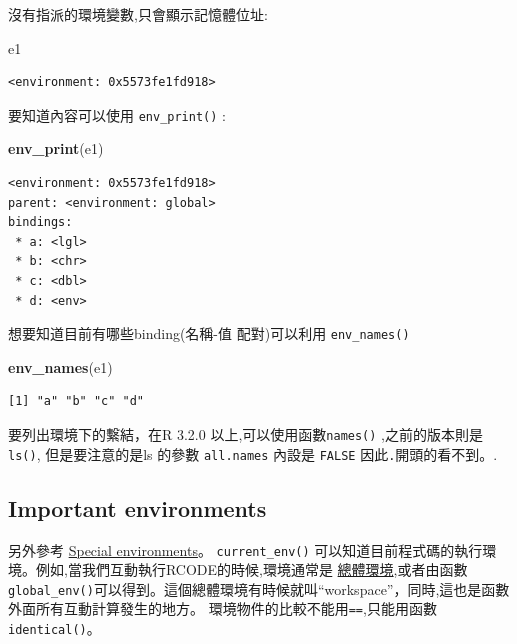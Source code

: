 \documentclass[]{book}
\newenvironment{Shaded}{\begin{snugshade}}{\end{snugshade}}
\newcommand{\KeywordTok}[1]{\textcolor[rgb]{0.13,0.29,0.53}{\textbf{#1}}}
\newcommand{\NormalTok}[1]{#1}
\theoremstyle{definition}
\theoremstyle{definition}
\theoremstyle{definition}
\theoremstyle{remark}
\begin{document}
沒有指派的環境變數,只會顯示記憶體位址:

\begin{Shaded}
\begin{Highlighting}[]
\NormalTok{e1}
\end{Highlighting}
\end{Shaded}

\begin{verbatim}
<environment: 0x5573fe1fd918>
\end{verbatim}

要知道內容可以使用 \texttt{env\_print()} :

\begin{Shaded}
\begin{Highlighting}[]
\KeywordTok{env_print}\NormalTok{(e1)}
\end{Highlighting}
\end{Shaded}

\begin{verbatim}
<environment: 0x5573fe1fd918>
parent: <environment: global>
bindings:
 * a: <lgl>
 * b: <chr>
 * c: <dbl>
 * d: <env>
\end{verbatim}

想要知道目前有哪些binding(名稱-值 配對)可以利用 \texttt{env\_names()}

\begin{Shaded}
\begin{Highlighting}[]
\KeywordTok{env_names}\NormalTok{(e1)}
\end{Highlighting}
\end{Shaded}

\begin{verbatim}
[1] "a" "b" "c" "d"
\end{verbatim}

要列出環境下的繫結，在R 3.2.0 以上,可以使用函數\texttt{names()}
,之前的版本則是 \texttt{ls()}, 但是要注意的是ls 的參數
\texttt{all.names} 內設是 \texttt{FALSE} 因此\texttt{.}開頭的看不到。.

\hypertarget{important-environments}{%
\subsection{Important environments}\label{important-environments}}

另外參考 \protect\hyperlink{function-envs}{Special environments}。
\texttt{current\_env()}
可以知道目前程式碼的執行環境。例如,當我們互動執行RCODE的時候,環境通常是
\protect\hyperlink{globalux5cux2520environment}{總體環境},或者由函數\texttt{global\_env()}可以得到。這個總體環境有時候就叫``workspace''，同時,這也是函數外面所有互動計算發生的地方。
環境物件的比較不能用\texttt{==},只能用函數\texttt{identical()}。
\end{document}
